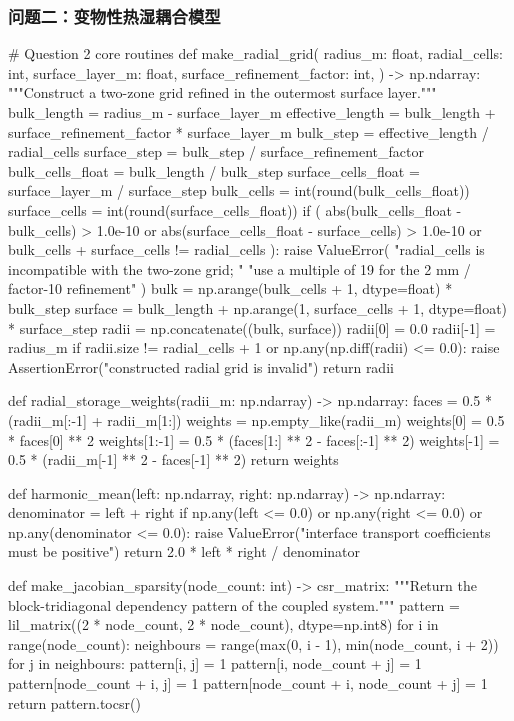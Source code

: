 \documentclass[withoutpreface,bwprint]{cumcmthesis}
\begin{document}
\subsubsection*{\centering 问题二：变物性热湿耦合模型}
\begin{PythonCode}
# Question 2 core routines
def make_radial_grid(
    radius_m: float,
    radial_cells: int,
    surface_layer_m: float,
    surface_refinement_factor: int,
) -> np.ndarray:
    """Construct a two-zone grid refined in the outermost surface layer."""
    bulk_length = radius_m - surface_layer_m
    effective_length = bulk_length + surface_refinement_factor * surface_layer_m
    bulk_step = effective_length / radial_cells
    surface_step = bulk_step / surface_refinement_factor
    bulk_cells_float = bulk_length / bulk_step
    surface_cells_float = surface_layer_m / surface_step
    bulk_cells = int(round(bulk_cells_float))
    surface_cells = int(round(surface_cells_float))
    if (
        abs(bulk_cells_float - bulk_cells) > 1.0e-10
        or abs(surface_cells_float - surface_cells) > 1.0e-10
        or bulk_cells + surface_cells != radial_cells
    ):
        raise ValueError(
            "radial_cells is incompatible with the two-zone grid; "
            "use a multiple of 19 for the 2 mm / factor-10 refinement"
        )
    bulk = np.arange(bulk_cells + 1, dtype=float) * bulk_step
    surface = bulk_length + np.arange(1, surface_cells + 1, dtype=float) * surface_step
    radii = np.concatenate((bulk, surface))
    radii[0] = 0.0
    radii[-1] = radius_m
    if radii.size != radial_cells + 1 or np.any(np.diff(radii) <= 0.0):
        raise AssertionError("constructed radial grid is invalid")
    return radii


def radial_storage_weights(radii_m: np.ndarray) -> np.ndarray:
    faces = 0.5 * (radii_m[:-1] + radii_m[1:])
    weights = np.empty_like(radii_m)
    weights[0] = 0.5 * faces[0] ** 2
    weights[1:-1] = 0.5 * (faces[1:] ** 2 - faces[:-1] ** 2)
    weights[-1] = 0.5 * (radii_m[-1] ** 2 - faces[-1] ** 2)
    return weights


def harmonic_mean(left: np.ndarray, right: np.ndarray) -> np.ndarray:
    denominator = left + right
    if np.any(left <= 0.0) or np.any(right <= 0.0) or np.any(denominator <= 0.0):
        raise ValueError("interface transport coefficients must be positive")
    return 2.0 * left * right / denominator


def make_jacobian_sparsity(node_count: int) -> csr_matrix:
    """Return the block-tridiagonal dependency pattern of the coupled system."""
    pattern = lil_matrix((2 * node_count, 2 * node_count), dtype=np.int8)
    for i in range(node_count):
        neighbours = range(max(0, i - 1), min(node_count, i + 2))
        for j in neighbours:
            pattern[i, j] = 1
            pattern[i, node_count + j] = 1
            pattern[node_count + i, j] = 1
            pattern[node_count + i, node_count + j] = 1
    return pattern.tocsr()



\end{PythonCode}
\end{document}
